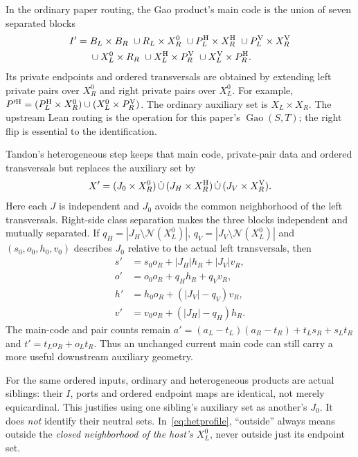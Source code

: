 \documentclass[11pt,a4paper]{article}
\theoremstyle{definition}
\theoremstyle{remark}
\newcommand{\Nb}{\mathcal N}
\newcommand{\Gao}{\operatorname{Gao}}
\newcommand{\code}[1]{\texttt{\detokenize{#1}}}
\begin{document}
In the ordinary paper routing, the Gao product's main code is the union
of seven separated blocks
\begin{align*}
 I'={}&B_L\times B_R\ \cup R_L\times X_R^0
 \ \cup P_L^{\rm H}\times X_R^{\rm H}
 \ \cup P_L^{\rm V}\times X_R^{\rm V}\\
 &\cup X_L^0\times R_R
 \ \cup X_L^{\rm H}\times P_R^{\rm V}
 \ \cup X_L^{\rm V}\times P_R^{\rm H}.
\end{align*}
Its private endpoints and ordered transversals are obtained by extending
left private pairs over $X_R^0$ and right private pairs over $X_L^0$.
For example,
$P'^{\rm H}=(P_L^{\rm H}\times X_R^0)\cup(X_L^0\times P_R^{\rm V})$.
The ordinary auxiliary set is $X_L\times X_R$.
The upstream Lean routing is the operation
\code{liftRPS S (flip T)} for this paper's $\Gao(S,T)$; the right flip
is essential to the identification.

Tandon's heterogeneous step keeps that main code, private-pair data
and ordered transversals but replaces the auxiliary set by
\begin{equation}\label{eq:hetero}
 X'=(J_0\times X_R^0)\,\dot\cup\,
     (J_H\times X_R^{\rm H})\,\dot\cup\,
     (J_V\times X_R^{\rm V}).
\end{equation}
Here each $J$ is independent and $J_0$ avoids the common neighborhood
of the left transversals. Right-side class separation makes the three
blocks independent and mutually separated. If
$q_H=|J_H\setminus\Nb(X_L^0)|$, $q_V=|J_V\setminus\Nb(X_L^0)|$
and $(s_0,o_0,h_0,v_0)$ describes $J_0$ relative to the actual left
transversals, then
\begin{align}
 s'&=s_0o_R+|J_H|h_R+|J_V|v_R,\nonumber\\
 o'&=o_0o_R+q_Hh_R+q_Vv_R,\label{eq:hetprofile}\\
 h'&=h_0o_R+(|J_V|-q_V)v_R,\nonumber\\
 v'&=v_0o_R+(|J_H|-q_H)h_R.\nonumber
\end{align}
The main-code and pair counts remain
$a'=(a_L-t_L)(a_R-t_R)+t_Ls_R+s_Lt_R$ and
$t'=t_Lo_R+o_Lt_R$. Thus an unchanged current main code can still
carry a more useful downstream auxiliary geometry.

For the same ordered inputs, ordinary and heterogeneous products are
actual siblings: their $I$, ports and ordered endpoint maps are
identical, not merely equicardinal. This justifies using one sibling's
auxiliary set as another's $J_0$. It does \emph{not} identify their
neutral sets. In~\eqref{eq:hetprofile}, ``outside'' always means outside
the \emph{closed neighborhood of the host's $X_L^0$}, never outside
just its endpoint set.
\end{document}
